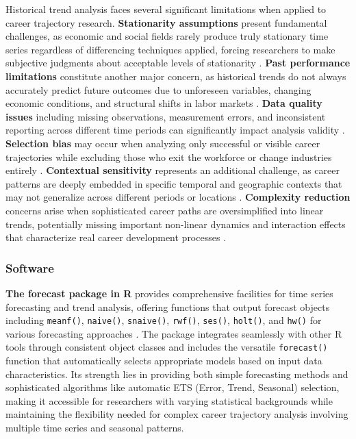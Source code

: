 \documentclass[../main.tex]{subfiles}
\begin{document}
Historical trend analysis faces several significant limitations when applied to career trajectory research. \textbf{Stationarity assumptions} present fundamental challenges, as economic and social fields rarely produce truly stationary time series regardless of differencing techniques applied, forcing researchers to make subjective judgments about acceptable levels of stationarity \parencite{wikipedia2005}. \textbf{Past performance limitations} constitute another major concern, as historical trends do not always accurately predict future outcomes due to unforeseen variables, changing economic conditions, and structural shifts in labor markets \parencite{netsuite2023}. \textbf{Data quality issues} including missing observations, measurement errors, and inconsistent reporting across different time periods can significantly impact analysis validity \parencite{shamrck2023}. \textbf{Selection bias} may occur when analyzing only successful or visible career trajectories while excluding those who exit the workforce or change industries entirely \parencite{nature2023}. \textbf{Contextual sensitivity} represents an additional challenge, as career patterns are deeply embedded in specific temporal and geographic contexts that may not generalize across different periods or locations \parencite{haas2006}. \textbf{Complexity reduction} concerns arise when sophisticated career paths are oversimplified into linear trends, potentially missing important non-linear dynamics and interaction effects that characterize real career development processes \parencite{wang2021}.

\subsubsection{Software}

\textbf{The forecast package in R} provides comprehensive facilities for time series forecasting and trend analysis, offering functions that output forecast objects including \texttt{meanf()}, \texttt{naive()}, \texttt{snaive()}, \texttt{rwf()}, \texttt{ses()}, \texttt{holt()}, and \texttt{hw()} for various forecasting approaches \parencite{otexts2023}. The package integrates seamlessly with other R tools through consistent object classes and includes the versatile \texttt{forecast()} function that automatically selects appropriate models based on input data characteristics. Its strength lies in providing both simple forecasting methods and sophisticated algorithms like automatic ETS (Error, Trend, Seasonal) selection, making it accessible for researchers with varying statistical backgrounds while maintaining the flexibility needed for complex career trajectory analysis involving multiple time series and seasonal patterns.
\end{document}
